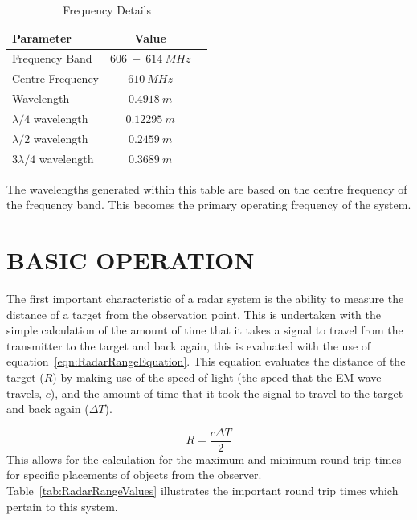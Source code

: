 \documentclass[11pt]{witseiepaper}
\begin{document}
\begin{bibunit}[witseie]
\begin{table}
    \caption{Frequency Details}
    \label{tab:FrequencyDetails}
    \begin{center}
        \begin{tabular}{p{70mm}cp{70mm}}
            \hline 
            Parameter & Value \\
            \hline
            Frequency Band & $606~-~614~MHz$ \\
            Centre Frequency & $610~MHz$ \\
            Wavelength & $0.4918~m$ \\
            $\lambda /4$ wavelength & $0.12295~m$ \\
            $\lambda /2$ wavelength & $0.2459~m$ \\
            $3 \lambda /4$ wavelength & $0.3689~m$ \\                
        \end{tabular}
    \end{center}
\end{table}
The wavelengths generated within this table are based on the centre frequency of the frequency band. This becomes the primary operating frequency of the system.



\section{BASIC OPERATION} \label{sec:BasicOperation}
The first important characteristic of a radar system is the ability to measure the distance of a target from the observation point. This is undertaken with the simple calculation of the amount of time that it takes a signal to travel from the transmitter to the target and back again, this is evaluated with the use of equation~\ref{eqn:RadarRangeEquation}. This equation evaluates the distance of the target ($R$) by making use of the speed of light (the speed that the EM wave travels, $c$), and the amount of time that it took the signal to travel to the target and back again ($\Delta T$).

\begin{equation} \label{eqn:RadarRangeEquation}
    R = \frac{c \Delta T}{2}
\end{equation}
This allows for the calculation for the maximum and minimum round trip times for specific placements of objects from the observer. Table~\ref{tab:RadarRangeValues} illustrates the important round trip times which pertain to this system.


\end{bibunit}
\end{document}
